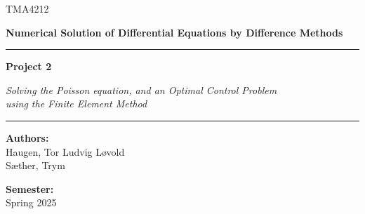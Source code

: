 \begin{titlepage}
    \newcommand{\HRule}{\rule{\linewidth}{0.5mm}}
  
    \center

    {\color{ntnu-blue}\sffamily\Large TMA4212 \par}
    {\sffamily\Large\bfseries Numerical Solution of Differential Equations by Difference Methods \par}
    
    \HRule
    \vspace{0.5cm}
  
    {\Large\sffamily\bfseries Project 2\par}
    \vspace{0.3cm}
    {\large\sffamily\textit{Solving the Poisson equation, and an Optimal Control Problem\\ using the Finite Element Method}\par}
  
    \vspace{0.5cm}
    \HRule
  
    \vfill
  
    \begin{minipage}{0.6\textwidth}
      \begin{flushleft}
        \large
        \textbf{Authors:}\\
        Haugen, Tor Ludvig Løvold \\
        Sæther, Trym\\ 
      \end{flushleft}
    \end{minipage}%
    \begin{minipage}{0.4\textwidth}
      \begin{flushright}
        \large
        \textbf{Semester:}\\
        Spring 2025
      \end{flushright}
    \end{minipage}
  

\end{titlepage}

